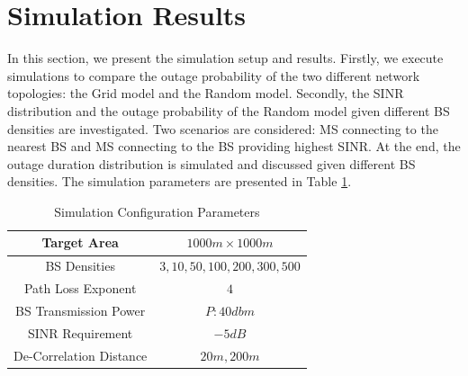 \documentclass[journal,10pt]{IEEEtran}
\begin{document}
 \section{Simulation Results}
 \label{4:SimuProb}
 \par In this section, we present the simulation setup and results. Firstly, we execute simulations to compare the outage probability of the two different network topologies: the Grid model and the Random model. Secondly, the SINR distribution and the outage probability of the Random model given different BS densities are investigated. Two scenarios are considered: MS connecting to the nearest BS and MS connecting to the BS providing highest SINR. At the end, the outage duration distribution is simulated and discussed given different BS densities. The simulation parameters are presented in Table \ref{SystemConfig2}. 
 \begin{table}
 \centering
 \caption{\label{SystemConfig2}Simulation Configuration Parameters}

 \begin{tabular}{|c|c|}

 \hline
 Target Area & $1000m\times 1000m$\\
 \hline
 BS Densities & $3, 10, 50, 100, 200, 300, 500$\\
 \hline
 Path Loss Exponent & $4$\\
 \hline
 BS Transmission Power & $P: 40dbm$\\
 \hline
 SINR Requirement & $-5dB$\\
 \hline
 De-Correlation Distance & $20m, 200m$\\
 \hline
 \end{tabular}

 \end{table}
\end{document}
